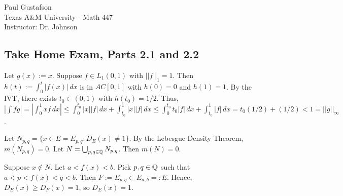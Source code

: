 \documentclass{article}
\begin{document}
\noindent Paul Gustafson\\
\noindent Texas A\&M University - Math 447\\ 
\noindent Instructor: Dr. Johnson

\subsection*{Take Home Exam, Parts 2.1 and 2.2}
 Let $g(x) := x$. Suppose $f \in L_1(0,1)$ with $||f||_1 = 1$. Then 
$h(t) := \int_0^t |f(x)| \,dx$ is in $AC[0,1]$ with $h(0) = 0$ and $h(1) = 1$. By the IVT, there exists $t_0 \in (0,1)$ with $h(t_0) = 1/2$. Thus,
$|\int fg| = |\int_0^1 xf \,dx|
 \le \int_0^{t_0} |x||f| \,dx + \int_{t_0}^1 |x||f|\,dx
 \le \int_0^{t_0} t_0|f| \,dx + \int_{t_0}^1 |f|\,dx
 = t_0 (1/2) + (1/2)
< 1 = ||g||_\infty
$.

 Let $N_{p,q} = \{x \in E = E_{p,q} : D_E(x) \ne 1 \}$.  By the Lebesgue Density Theorem, $m(N_{p,q}) = 0$. Let $N = \bigcup_{p,q \in \mathbb{Q}} N_{p,q}$.  Then $m(N) = 0$. 

Suppose $x \not\in N$. Let $a < f(x) < b$.  Pick $p,q \in \mathbb{Q}$ such that $a < p < f(x) < q < b$.  Then $F := E_{p,q} \subset E_{a,b} =: E$.  Hence, $D_E(x) \ge D_F(x)  = 1$, so $D_E(x) = 1$.
\end{document}
